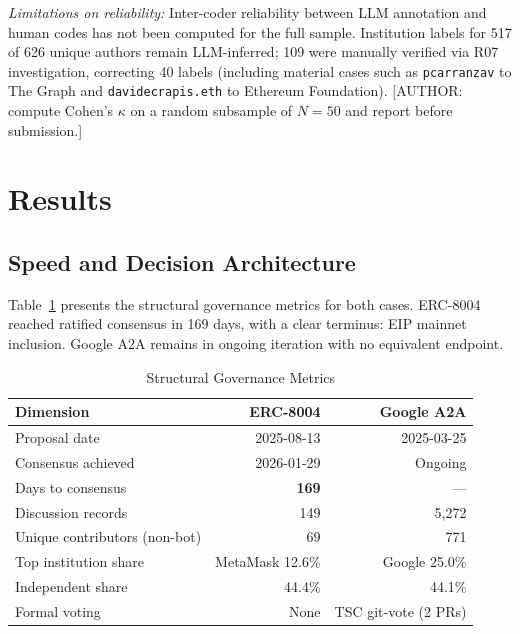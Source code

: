 \documentclass[conference]{IEEEtran}
\begin{document}
\noindent\textit{Limitations on reliability:} Inter-coder reliability
between LLM annotation and human codes has not been computed for the full
sample. Institution labels for 517 of 626 unique authors remain LLM-inferred;
109 were manually verified via R07 investigation, correcting 40 labels
(including material cases such as \texttt{pcarranzav} to The Graph and
\texttt{davidecrapis.eth} to Ethereum Foundation). [AUTHOR: compute Cohen's
$\kappa$ on a random subsample of $N=50$ and report before submission.]


\section{Results}

\subsection{Speed and Decision Architecture}

Table~\ref{tab:structural} presents the structural governance metrics for
both cases. ERC-8004 reached ratified consensus in 169 days, with a
clear terminus: EIP mainnet inclusion. Google A2A remains in ongoing
iteration with no equivalent endpoint.

\begin{table}[h]
\caption{Structural Governance Metrics}
\label{tab:structural}
\centering
\begin{tabular}{lrr}
\toprule
\textbf{Dimension} & \textbf{ERC-8004} & \textbf{Google A2A} \\
\midrule
Proposal date & 2025-08-13 & 2025-03-25 \\
Consensus achieved & 2026-01-29 & Ongoing \\
Days to consensus & \textbf{169} & — \\
Discussion records & 149 & 5,272 \\
Unique contributors (non-bot) & 69 & 771 \\
Top institution share & MetaMask 12.6\% & Google 25.0\% \\
Independent share & 44.4\% & 44.1\% \\
Formal voting & None & TSC git-vote (2 PRs) \\
\bottomrule
\end{tabular}
\end{table}
\end{document}
